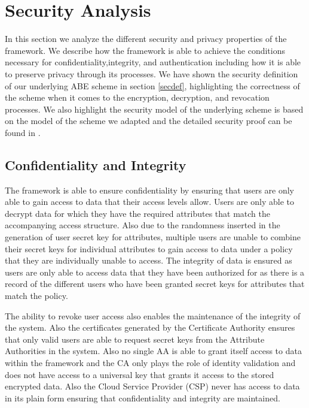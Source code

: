 \section{Security Analysis}

In this section we analyze the different security and privacy properties of the framework. We describe how the framework is able to achieve the conditions necessary for confidentiality,integrity, and authentication including how it is able to preserve privacy through its processes. We have shown the security definition of our underlying ABE scheme in section \ref{secdef}, highlighting the correctness of the scheme when it comes to the encryption, decryption, and revocation processes. We also highlight the security model of the underlying scheme is based on the model of the scheme we adapted and the detailed security proof can be found in \cite{Yang2014}.

\subsection*{Confidentiality and Integrity}

The framework is able to ensure confidentiality by ensuring that users are only able to gain access to data that their access levels allow. Users are only able to decrypt data for which they have the required attributes that match the accompanying access structure. Also due to the randomness inserted in the generation of user secret key for attributes, multiple users are unable to combine their secret keys for individual attributes to gain access to data under a policy that they are individually unable to access. The integrity of data is ensured as users are only able to access data that they have been authorized for as there is a record of the different users who have been granted secret keys for attributes that match the policy.

The ability to revoke user access also enables the maintenance of the integrity of the system. Also the certificates generated by the Certificate Authority ensures that only valid users are able to request secret keys from the Attribute Authorities in the system. Also no single AA is able to grant itself access to data within the framework and the CA only plays the role of identity validation and does not have access to a universal key that grants it access to the stored encrypted data. Also the Cloud Service Provider (CSP) never has access to data in its plain form ensuring that confidentiality and integrity are maintained.

